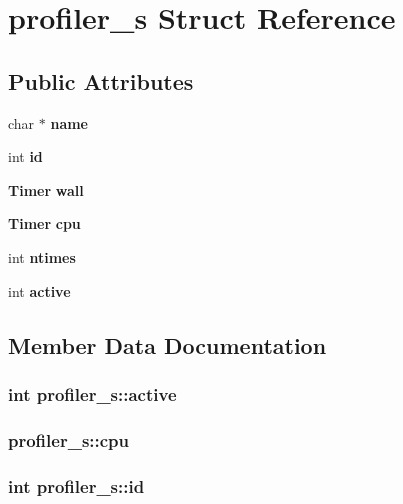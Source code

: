 \section{profiler\_\-s Struct Reference}
\label{structprofiler__s}
\subsection*{Public Attributes}
\begin{CompactItemize}
\item 
char $\ast$ {\bf name}
\item 
int {\bf id}
\item 
{\bf Timer} {\bf wall}
\item 
{\bf Timer} {\bf cpu}
\item 
int {\bf ntimes}
\item 
int {\bf active}
\end{CompactItemize}


\subsection{Member Data Documentation}
\subsubsection{\setlength{\rightskip}{0pt plus 5cm}int {\bf profiler\_\-s::active}}\label{structprofiler__s_f4ee62bec7af8a9d429699e63c10ce66}


\subsubsection{ {\bf profiler\_\-s::cpu}}\label{structprofiler__s_a6cb3df724eab4138668d355d0f256b4}


\subsubsection{\setlength{\rightskip}{0pt plus 5cm}int {\bf profiler\_\-s::id}}\label{structprofiler__s_e18e2246c3fe871ad5fe29b6eb795e68}


